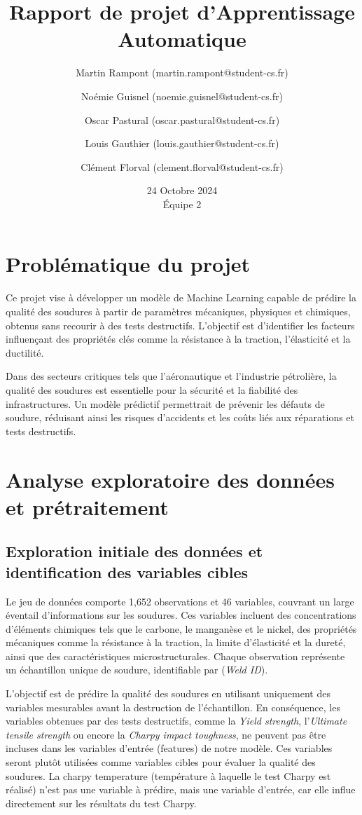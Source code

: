 \documentclass{article}
\title{Rapport de projet d'Apprentissage Automatique}
\author{
    \small Martin Rampont (martin.rampont@student-cs.fr) \and 
    \small Noémie Guisnel (noemie.guisnel@student-cs.fr) \and 
    \small Oscar Pastural (oscar.pastural@student-cs.fr) \and 
    \small Louis Gauthier (louis.gauthier@student-cs.fr) \and 
    \small Clément Florval (clement.florval@student-cs.fr)
}
\date{24 Octobre 2024 \\ Équipe 2}
\begin{document}
\maketitle
\tableofcontents
\newpage
\section{Problématique du projet}

Ce projet vise à développer un modèle de Machine Learning capable de prédire la qualité des soudures à partir de paramètres mécaniques, physiques et chimiques, obtenus sans recourir à des tests destructifs. L'objectif est d'identifier les facteurs influençant des propriétés clés comme la résistance à la traction, l'élasticité et la ductilité.

Dans des secteurs critiques tels que l'aéronautique et l'industrie pétrolière, la qualité des soudures est essentielle pour la sécurité et la fiabilité des infrastructures. Un modèle prédictif permettrait de prévenir les défauts de soudure, réduisant ainsi les risques d'accidents et les coûts liés aux réparations et tests destructifs.

\section{Analyse exploratoire des données et prétraitement}

\subsection{Exploration initiale des données et identification des variables cibles}

Le jeu de données comporte 1,652 observations et 46 variables, couvrant un large éventail d'informations sur les soudures. Ces variables incluent des concentrations d'éléments chimiques tels que le carbone, le manganèse et le nickel, des propriétés mécaniques comme la résistance à la traction, la limite d’élasticité et la dureté, ainsi que des caractéristiques microstructurales. Chaque observation représente un échantillon unique de soudure, identifiable par (\textit{Weld ID}).

L’objectif est de prédire la qualité des soudures en utilisant uniquement des variables mesurables avant la destruction de l'échantillon. En conséquence, les variables obtenues par des tests destructifs, comme la \textit{Yield strength}, l'\textit{Ultimate tensile strength} ou encore la \textit{Charpy impact toughness}, ne peuvent pas être incluses dans les variables d'entrée (features) de notre modèle. Ces variables seront plutôt utilisées comme variables cibles pour évaluer la qualité des soudures. La charpy temperature (température à laquelle le test Charpy est réalisé) n'est pas une variable à prédire, mais une variable d'entrée, car elle influe directement sur les résultats du test Charpy.
\end{document}
